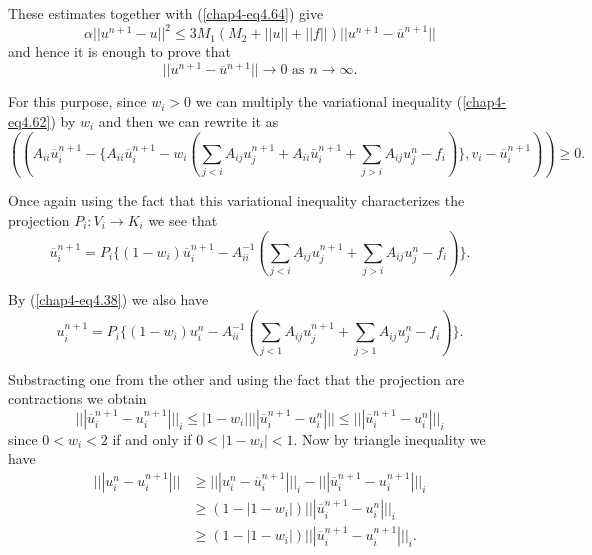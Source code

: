These estimates together with (\ref{chap4-eq4.64}) give
\begin{equation*}
\alpha ||u^{n+1} - u||^{2} \leq 3M_{1}(M_{2} + ||u|| + ||f||) ||u^{n+1}-\overline{u}^{n+1}||\tag{4.67}\label{chap4-eq4.67}
\end{equation*}
and hence it is enough to prove that
\begin{equation*}
|| u^{n+1} - \overline{u}^{n+1} || \to 0 \text{ as } n \to \infty.\tag{4.68}\label{chap3-eq4.68}
\end{equation*}

For this purpose, since $w_{i} > 0$ we can multiply the variational inequality (\ref{chap4-eq4.62}) by $w_{i}$ and then we can rewrite it as
{\fontsize{10}{12}\selectfont
\begin{equation*}
((A_{ii} \overline{u}_{i}^{n+1} - \{A_{ii} \overline{u}_{i}^{n+1} - w_{i} (\sum_{j<i} A_{ij} u^{n+1}_j + A_{ii} \bar{u}^{n+1}_i + \sum_{j>i} A_{ij} u_{j}^{n} - f_{i})\}, v_{i} - \overline{u}_{i}^{n+1})) \geq 0. \tag*{$(4.62)'$}\label{chap4-eq4.62'}
\end{equation*}}\pageoriginale

Once again using the fact that this variational inequality characterizes the projection $P_{i} : V_{i} \to K_{i}$ we see that
\begin{equation*}
\overline{u}_{i}^{n+1} = P_{i} \{(1-w_{i})\overline{u}_{i}^{n+1} - A_{ii}^{-1} (\sum_{j<i} A_{ij} u_{j}^{n+1} + \sum_{j>i} A_{ij} u_{j}^{n} - f_{i})\}.\tag{4.69}\label{chap4-eq4.69}
\end{equation*}

By (\ref{chap4-eq4.38}) we also have
$$
u_{i}^{n+1} = P_{i} \{(1-w_{i}) u_{i}^{n} - A_{ii}^{-1} (\sum_{j<1} A_{ij} u_{j}^{n+1} + \sum_{j>1} A_{ij} u_{j}^{n} - f_{i})\}.
$$

Substracting one from the other and using the fact that the projection are contractions we obtain
\begin{equation*}
||| \overline{u}_{i}^{n+1} - u_{i}^{n+1} |||_{i} \leq |1-w_{i}| ||| \overline{u}_{i}^{n+1} - u_{i}^{n} ||| \leq ||| \overline{u}_{i}^{n+1} - u_{i}^{n} |||_{i}\tag{4.70}\label{chap4-eq4.70}
\end{equation*}
since $0 < w_{i} < 2$ if and only if $0 < |1-w_{i}| < 1$. Now by triangle inequality we have
\begin{align*}
||| u_{i}^{n} - u_{i}^{n+1} ||| & \geq ||| u_{i}^{n} - \overline{u}_{i}^{n+1} |||_{i} - ||| \overline{u}_{i}^{n+1} - u_{i}^{n+1} |||_{i}\\
& \geq (1 - |1-w_{i}|) |||\overline{u}_{i}^{n+1} - u_{i}^{n}|||_{i}\\
& \geq (1 - |1-w_{i}|) ||| \overline{u}_{i}^{n+1} - u_{i}^{n+1} |||_{i}.
\end{align*}

